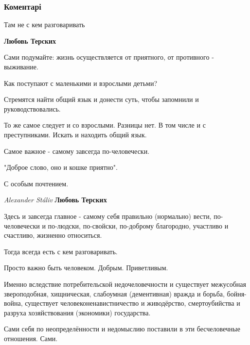  
 
 
 
 
\subsubsection{Коментарі}

\begin{itemize} %
Там не с кем разговаривать

\begin{itemize} %
\textbf{Любовь Терских} 

Сами подумайте: жизнь осуществляется от приятного, от противного - выживание.

Как поступают с маленькими и взрослыми детьми?

Стремятся найти общий язык и донести суть, чтобы запомнили и руководствовались.

То же самое следует и со взрослыми. Разницы нет. В том числе и с преступниками.
Искать и находить общий язык.

Самое важное - самому завсегда по-человечески.

"Доброе слово, оно и кошке приятно".

С особым почтением.
\end{itemize} %

\emph{Alexander Stáliv}
\textbf{Любовь Терских} 

Здесь и завсегда главное - самому себя правильно (нормально) вести,
по-человечески и по-людски, по-свойски, по-доброму благородно, участливо и
счастливо, жизненно относиться.

Тогда всегда есть с кем разговаривать.

Просто важно быть человеком. Добрым. Приветливым.

Именно вследствие потребительской недочеловечности и существует межусобная
звероподобная, хищническая, слабоумная (дементивная) вражда и борьба,
бойня-война, существует человеконенавистничество и живодёрство, смертоубийства
и разруха хозяйствования (экономики) государства.

Сами себя по неопределённости и недомыслию поставили в эти бесчеловечные
отношения. Сами.


\end{itemize}
